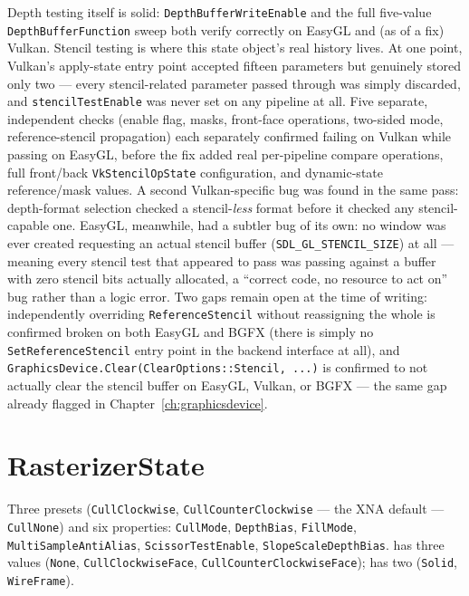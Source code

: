 Depth testing itself is solid: \texttt{DepthBufferWriteEnable} and the full five-value
\texttt{DepthBufferFunction} sweep both verify correctly on EasyGL and (as of a fix) Vulkan.
Stencil testing is where this state object's real history lives. At one point, Vulkan's
apply-state entry point accepted fifteen parameters but genuinely stored only two --- every
stencil-related parameter passed through was simply discarded, and \texttt{stencilTestEnable}
was never set on any pipeline at all. Five separate, independent checks (enable flag, masks,
front-face operations, two-sided mode, reference-stencil propagation) each separately
confirmed failing on Vulkan while passing on EasyGL, before the fix added real per-pipeline
compare operations, full front/back \texttt{VkStencilOpState} configuration, and dynamic-state
reference/mask values. A second Vulkan-specific bug was found in the same pass: depth-format
selection checked a stencil-\emph{less} format before it checked any stencil-capable one.
EasyGL, meanwhile, had a subtler bug of its own: no window was ever created requesting an
actual stencil buffer (\texttt{SDL\_GL\_STENCIL\_SIZE}) at all --- meaning every stencil test
that appeared to pass was passing against a buffer with zero stencil bits actually allocated,
a ``correct code, no resource to act on'' bug rather than a logic error. Two gaps remain
open at the time of writing: independently overriding \texttt{ReferenceStencil} without
reassigning the whole  is confirmed broken on both EasyGL and
BGFX (there is simply no \texttt{SetReferenceStencil} entry point in the backend interface at
all), and \texttt{GraphicsDevice.Clear(ClearOptions::Stencil, ...)} is confirmed to not
actually clear the stencil buffer on EasyGL, Vulkan, or BGFX --- the same gap already flagged
in Chapter~\ref{ch:graphicsdevice}.

\section{RasterizerState}

Three presets (\texttt{CullClockwise}, \texttt{CullCounterClockwise} --- the XNA default ---
\texttt{CullNone}) and six properties: \texttt{CullMode}, \texttt{DepthBias},
\texttt{FillMode}, \texttt{MultiSampleAntiAlias}, \texttt{ScissorTestEnable},
\texttt{SlopeScaleDepthBias}.  has three values
(\texttt{None}, \texttt{CullClockwiseFace}, \texttt{CullCounterClockwiseFace});
 has two (\texttt{Solid}, \texttt{WireFrame}).

